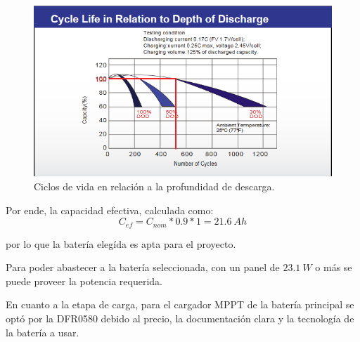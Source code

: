 \begin{figure}[H]
	\centering
	\includegraphics[width=0.9\linewidth]{ImagenesFactibilidad/UL24-12_Cdod}	
	\caption{Ciclos de vida en relación a la profundidad de descarga.}
	\label{fig:cdod}
\end{figure}

Por ende, la capacidad efectiva, calculada como:
\begin{equation}
C_{ef} = C_{nom}*0.9*1 = 21.6 \ Ah
\end{equation}

por lo que la batería elegída es apta para el proyecto.


Para poder abastecer a la batería seleccionada, con un panel de $23.1 \ W$ o más se puede proveer la potencia requerida.

En cuanto a la etapa de carga, para el cargador MPPT de la batería principal se optó por la DFR0580 debido al precio, la documentación clara y la tecnología de la batería a usar.

